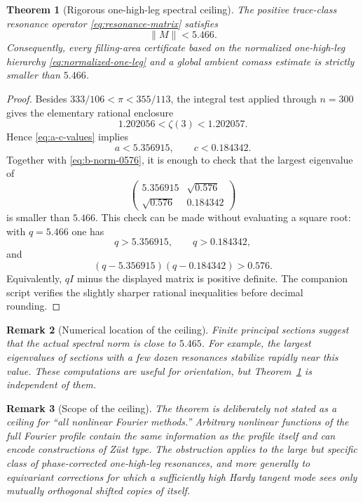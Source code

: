 \documentclass[11pt]{article}
\newtheorem{theorem}{Theorem}[section]
\newtheorem{remark}[theorem]{Remark}
\begin{document}
\begin{theorem}[Rigorous one-high-leg spectral ceiling]
\label{thm:one-leg-5466}
The positive trace-class resonance operator \eqref{eq:resonance-matrix}
satisfies
\begin{equation}\label{eq:5466-ceiling}
        \boxed{\|M\|<5.466.}
\end{equation}
Consequently, every filling-area certificate based on the normalized
one-high-leg hierarchy \eqref{eq:normalized-one-leg} and a global ambient
comass estimate is strictly smaller than $5.466$.
\end{theorem}

\begin{proof}
Besides $333/106<\pi<355/113$, the integral test applied through $n=300$
gives the elementary rational enclosure
\[
        1.202056<\zeta(3)<1.202057.
\]
Hence \eqref{eq:a-c-values} implies
\[
        a<5.356915,
        \qquad
        c<0.184342.
\]
Together with \eqref{eq:b-norm-0576}, it is enough to check that the largest
eigenvalue of
\[
        \begin{pmatrix}
        5.356915&\sqrt{0.576}\\
        \sqrt{0.576}&0.184342
        \end{pmatrix}
\]
is smaller than $5.466$.  This check can be made without evaluating a square
root: with $q=5.466$ one has
\[
        q>5.356915,\qquad q>0.184342,
\]
and
\[
 (q-5.356915)(q-0.184342)>0.576.
\]
Equivalently, $qI$ minus the displayed matrix is positive definite.  The
companion script verifies the slightly sharper rational inequalities before
decimal rounding.
\end{proof}

\begin{remark}[Numerical location of the ceiling]
Finite principal sections suggest that the actual spectral norm is close to
$5.465$.  For example, the largest eigenvalues of sections with a few dozen
resonances stabilize rapidly near this value.  These computations are useful for
orientation, but Theorem~\ref{thm:one-leg-5466} is independent of them.
\end{remark}

\begin{remark}[Scope of the ceiling]
The theorem is deliberately not stated as a ceiling for ``all nonlinear Fourier
methods.''  Arbitrary nonlinear functions of the full Fourier profile contain the
same information as the profile itself and can encode constructions of Z\"ust type.
The obstruction applies to the large but specific class of phase-corrected
\emph{one-high-leg} resonances, and more generally to equivariant corrections for
which a sufficiently high Hardy tangent mode sees only mutually orthogonal shifted
copies of itself.
\end{remark}
\end{document}
